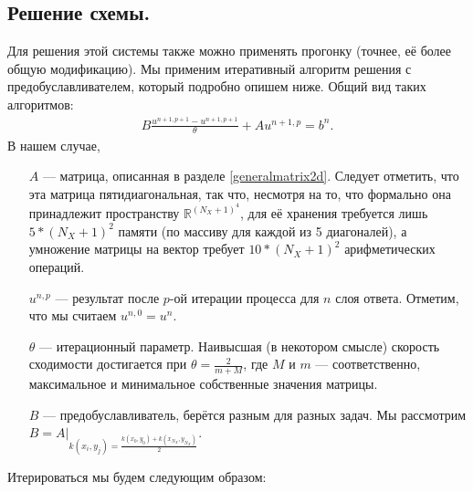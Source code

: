 \documentclass[14pt,a4paper]{extarticle}
\newcommand{\1}{\mathbbm{1}}
\newcommand{\R}{\mathbb{R}}
\begin{document}
\subsection{Решение схемы.}
Для решения этой системы также можно применять прогонку (точнее, её более общую модификацию). Мы применим итеративный алгоритм решения с предобуславливателем, который подробно опишем ниже. Общий вид таких алгоритмов:
\begin{align*}
    B \frac{u^{n+1, p+1} - u^{n+1, p+1}}{\theta} + A u^{n+1, p} = b^n.
\end{align*}
В нашем случае, 
\begin{enumerate}
    \item[$A$] --- матрица, описанная в разделе \ref{generalmatrix2d}. Следует отметить, что эта матрица пятидиагональная, так что, несмотря на то, что формально она принадлежит пространству $\R ^{(N_X+1)^4}$, для её хранения требуется лишь $5 * (N_X+1)^2$ памяти (по массиву для каждой из 5 диагоналей), а умножение матрицы на вектор требует $10 * (N_X+1)^2$ арифметических операций.
    \item[$u^{n, p}$] --- результат после $p$-ой итерации процесса для $n$ слоя ответа. Отметим, что мы считаем $u^{n, 0} = u^n$.
    \item[$\theta$] --- итерационный параметр. Наивысшая (в некотором смысле) скорость сходимости достигается при $\theta = \frac{2}{m + M}$, где $M$ и $m$ --- соответственно, максимальное и минимальное собственные значения матрицы. 
    \item[$B$] --- предобуславливатель, берётся разным для разных задач. Мы рассмотрим $B = A \big|_{k(x_i, y_j) = \frac{k(x_0, y_0)+k(x_{N_X}, y_{N_X})}{2}}$.
\end{enumerate}
Итерироваться мы будем следующим образом:
\end{document}
